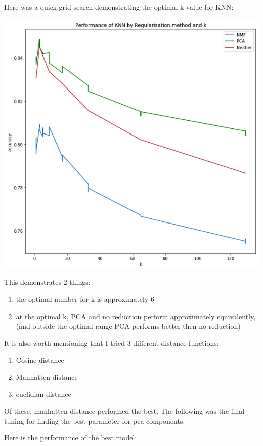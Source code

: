 \documentclass[11pt]{article}
\begin{document}
Here was a quick grid search demonstrating the optimal k value for KNN:
\begin{center}
\includegraphics[width=.9\linewidth]{.images/Experimentation_and_Results/2020-10-21_21-17-50_screenshot.png}
\end{center}

This demonstrates 2 things:
\begin{enumerate}
\item the optimal number for k is approximately 6
\item at the optimal k, PCA and no reduction perform approximately equivalently, (and outside the optimal range PCA performs better then no reduction)
\end{enumerate}

It is also worth mentioning that I tried 3 different distance functions:
\begin{enumerate}
\item Cosine distance
\item Manhatten distance
\item euclidian distance
\end{enumerate}

Of these, manhatten distance performed the best. The following was the final tuning for finding the best parameter for pca components.

Here is the performance of the best model:
\end{document}
